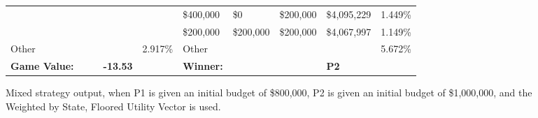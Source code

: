 \documentclass[11pt]{article}
\begin{document}
\begin{figure}
\begin{tabular}{ |p{1.0cm}p{1.0cm}p{1.0cm}p{2.0cm}|p{1.0cm}||p{1.0cm}p{1.0cm}p{1.0cm}p{2.0cm}|p{1.0cm}|}
&&&&                                                & \$400,000 & \$0& \$200,000 & \$4,095,229  & 1.449\% \\\
&&&&                                                & \$200,000& \$200,000& \$200,000 & \$4,067,997  & 1.149\% \\
\hline
Other &&&& 2.917\% & Other &&&& 5.672\% \\
\hline
\small \textbf{Game Value:} &&& \small \textbf{-13.53} && \small \textbf{Winner:} &&& \small \textbf{P2}&\\
\hline
\end{tabular}
\caption{Mixed strategy output, when P1 is given an initial budget of \$800,000, P2 is given an initial budget of \$1,000,000, and the Weighted by State, Floored Utility Vector is used.}
\label{8v10table.2}
\end{figure}
\end{document}
